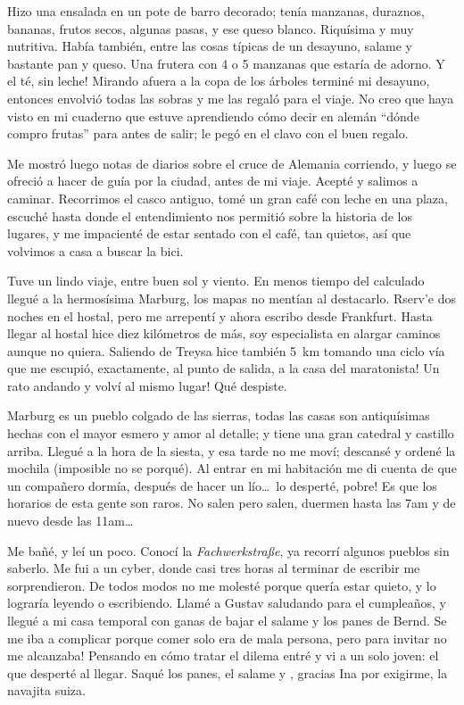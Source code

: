 Hizo una ensalada en un pote de barro decorado; ten\'ia manzanas, duraznos,
bananas, frutos secos, algunas pasas, y ese queso blanco. Riqu\'isima y muy
nutritiva. Hab\'ia tambi\'en, entre las cosas t\'ipicas de un desayuno, salame
y bastante pan y queso. Una frutera con 4 o 5 manzanas que estar\'ia de
adorno. \textexclamdown Y el t\'e, sin leche! Mirando afuera a la copa de los
\'arboles termin\'e mi desayuno, entonces envolvi\'o todas las sobras y me las
regal\'o para el viaje. No creo que haya visto en mi cuaderno que estuve
aprendiendo c\'omo decir en alem\'an ``d\'onde compro frutas'' para antes de
salir; le peg\'o en el clavo con el buen regalo.

Me mostr\'o luego notas de diarios sobre el cruce de Alemania corriendo, y
luego se ofreci\'o a hacer de gu\'ia por la ciudad, antes de mi viaje.
Acept\'e y salimos a caminar. Recorrimos el casco antiguo, tom\'e un gran
caf\'e con leche en una plaza, escuch\'e hasta donde el entendimiento nos
permiti\'o sobre la historia de los lugares, y me impacient\'e de estar
sentado con el caf\'e, tan quietos, as\'i que volvimos a casa a buscar la
bici.

Tuve un lindo viaje, entre buen sol y viento. En menos tiempo del calculado
llegu\'e a la hermos\'isima Marburg, los mapas no ment\'ian al destacarlo.
Rserv'e dos noches en el hostal, pero me arrepent\'i y ahora escribo desde
Frankfurt. Hasta llegar al hostal hice diez kil\'ometros de m\'as, soy
especialista en alargar caminos aunque no quiera. Saliendo de Treysa hice
tambi\'en 5~km tomando una ciclo v\'ia que me escupi\'o, exactamente, al punto
de salida, \textexclamdown a la casa del maratonista! \textexclamdown Un rato
andando y volv\'i al mismo lugar! Qu\'e despiste.

Marburg es un pueblo colgado de las sierras, todas las casas son antiqu\'isimas
hechas con el mayor esmero y amor al detalle; y tiene una gran catedral y
castillo arriba. Llegu\'e a la hora de la siesta, y esa tarde no me mov\'i;
descans\'e y orden\'e la mochila (imposible no se porqu\'e). Al entrar en mi
habitaci\'on me di cuenta de que un compa\~nero dorm\'ia, despu\'es de hacer un
l\'io\ldots\ \textexclamdown lo despert\'e, pobre! Es que los horarios de esta
gente son raros. No salen pero salen, duermen hasta las 7am y de nuevo desde las
11am\ldots

Me ba\~n\'e, y le\'i un poco. Conoc\'i la \emph{Fachwerkstra\ss e}, ya recorr\'i
algunos pueblos sin saberlo. Me fui a un cyber, donde casi tres horas al
terminar de escribir me sorprendieron. De todos modos no me molest\'e porque
quer\'ia estar quieto, y lo lograr\'ia leyendo o escribiendo. Llam\'e a Gustav
saludando para el cumplea\~nos, y llegu\'e a mi casa temporal con ganas de bajar
el salame y los panes de Bernd. \textexclamdown Se me iba a complicar porque
comer solo era de mala persona, pero para invitar no me alcanzaba! Pensando en
c\'omo tratar el dilema entr\'e y vi a un solo joven: el que despert\'e al
llegar. Saqu\'e los panes, el salame y , gracias Ina por exigirme, la navajita
suiza.

